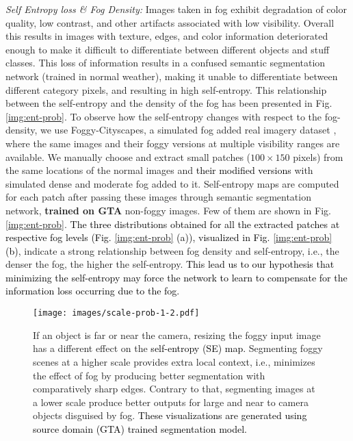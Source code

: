 \documentclass[final,5p,times,twocolumn]{elsarticle}
\begin{document}
\textit{Self Entropy loss \& Fog Density:} Images taken in fog exhibit degradation of color quality, low contrast, and other artifacts associated with low visibility. 
Overall this results in images with texture, edges, and color information deteriorated enough to make it difficult to differentiate between different objects and stuff classes. 
This loss of information results in a confused semantic segmentation network (trained in normal weather), making it unable to differentiate between different category pixels, and resulting in high self-entropy. 
This relationship between the self-entropy and the density of the fog has been presented in Fig. \ref{img:ent-prob}. 
To observe how the self-entropy changes with respect to the fog-density, we use Foggy-Cityscapes, a simulated fog added real imagery dataset \cite{sakaridis2018semantic}, where the same images and their foggy versions at multiple visibility ranges are available.
We manually choose and extract small patches ($100 \times 150$ pixels) from the same locations  of the normal images and \textcolor{black}{their modified versions} with simulated dense and moderate fog added to it.  
Self-entropy maps are computed for each patch after passing these images through semantic segmentation network, \textbf{trained on GTA} non-foggy images. Few of them are shown in Fig. \ref{img:ent-prob}.
\textcolor{black}{The three distributions obtained for all the extracted patches at respective fog levels (Fig. \ref{img:ent-prob} (a)), visualized in Fig. \ref{img:ent-prob} (b)}, indicate a strong relationship between fog density and self-entropy, i.e., the denser the fog, the higher the self-entropy. 
\textcolor{black}{This lead us to our hypothesis that minimizing the self-entropy may force the network to learn to compensate for the information loss occurring due to the fog.}



\begin{figure*}[htb]
\centering
\texttt{[image: images/scale-prob-1-2.pdf]}
 	\scriptsize
 	\caption{If an object is far or near the camera, resizing the foggy input image has a different effect on the \textcolor{black}{ self-entropy (SE) map.} 
Segmenting foggy scenes at a higher scale provides extra local context, i.e., minimizes the effect of fog by producing better segmentation with comparatively sharp edges. Contrary to that, segmenting images at a lower scale produce better outputs for large and near to camera objects disguised by fog.  \textcolor{black}{These visualizations are generated using source domain (GTA) trained segmentation model.}}

 	\label{img:scale-prob}
\end{figure*}
\end{document}
